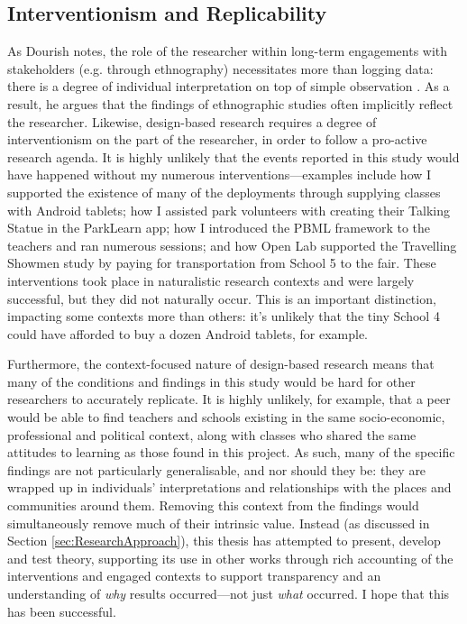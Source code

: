 \subsection*{Interventionism and Replicability}

As Dourish notes, the role of the researcher within long-term engagements with stakeholders (e.g. through ethnography) necessitates more than logging data: there is a degree of individual interpretation on top of simple observation \citep{Dourish2006}. As a result, he argues that the findings of ethnographic studies often implicitly reflect the researcher.  Likewise, design-based research requires a degree of interventionism on the part of the researcher, in order to follow a pro-active research agenda. It is highly unlikely that the events reported in this study would have happened without my numerous interventions---examples include how I supported the existence of many of the deployments through supplying classes with Android tablets; how I assisted park volunteers with creating their Talking Statue in the ParkLearn app; how I introduced the PBML framework to the teachers and ran numerous sessions; and how Open Lab supported the Travelling Showmen study by paying for transportation from School 5 to the fair. These interventions took place in naturalistic research contexts and were largely successful, but they did not naturally occur. This is an important distinction, impacting some contexts more than others: it's unlikely that the tiny School 4 could have afforded to buy a dozen Android tablets, for example.

Furthermore, the context-focused nature of design-based research means that many of the conditions and findings in this study would be hard for other researchers to accurately replicate. It is highly unlikely, for example, that a peer would be able to find teachers and schools existing in the same socio-economic, professional and political context, along with classes who shared the same attitudes to learning as those found in this project. As such, many of the specific findings are not particularly generalisable, and nor should they be: they are wrapped up in individuals' interpretations and relationships with the places and communities around them. Removing this context from the findings would simultaneously remove much of their intrinsic value. Instead (as discussed in Section \ref{sec:ResearchApproach}), this thesis has attempted to present, develop and test theory, supporting its use in other works through rich accounting of the interventions and engaged contexts to support transparency and an understanding of \textit{why} results occurred---not just \textit{what} occurred. I hope that this has been successful.

